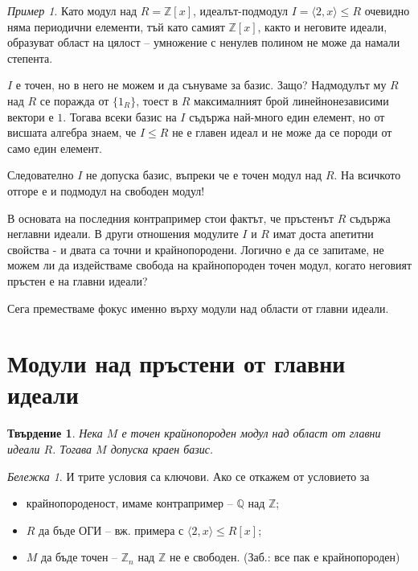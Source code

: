 \documentclass{article}
\newif\ifusemulticols
\theoremstyle{definition}
\theoremstyle{remark}
\newtheorem*{note}{Бележка}
\newtheorem{example}{Пример}[section]
\theoremstyle{plain}
\theoremstyle{plain}
\newtheorem{prop}[theorem]{Твърдение}
\newenvironment{mymulticols}
    { \ifusemulticols \begin{multicols}{2} \fi }
    { \ifusemulticols \end{multicols} \fi }
\newcommand{\Z}{\mathbb{Z}}
\begin{document}
\begin{mymulticols}
\begin{example}
    Като модул над $R = \Z[x]$, идеалът-подмодул $I = \langle 2,x \rangle \le R$ очевидно няма
    периодични елементи, тъй като самият $\Z[x]$, както и неговите идеали, образуват област на
    цялост -- умножение с ненулев полином не може да намали степента.

    $I$ е точен, но в него не можем и да сънуваме за базис. Защо?
    Надмодулът му $R$ над $R$ се поражда от $\{1_R\}$, тоест в $R$ максималният брой
    линейнонезависими вектори е $1$.
    Тогава всеки базис на $I$ съдържа най-много един елемент, но от висшата алгебра знаем, че $I \le
    R$ не е главен идеал и не може да се породи от само един елемент.

    Следователно $I$ не допуска базис, въпреки че е точен модул над $R$.
    На всичкото отгоре е и подмодул на свободен модул!
\end{example}

В основата на последния контрапример стои фактът, че пръстенът $R$ съдържа неглавни идеали.
В други отношения модулите $I$ и $R$ имат доста апетитни свойства - и двата са точни и крайнопородени.
Логично е да се запитаме, не можем ли да издействаме свобода на крайнопороден точен модул, когато
неговият пръстен е на главни идеали?

Сега преместваме фокус именно върху модули над области от главни идеали.

\section{Модули над пръстени от главни идеали}

\begin{prop}
    Нека $M$ е точен крайнопороден модул над област от главни идеали $R$. Тогава $M$ допуска краен
    базис.
\end{prop}

\begin{note}
    И трите условия са ключови. Ако се откажем от условието за
    \begin{itemize}
        \item крайнопороденост, имаме контрапример -- $\mathbb Q$ над $\Z$;
        \item $R$ да бъде ОГИ -- вж. примера с $\langle 2, x \rangle \le R[x]$;
            \item $M$ да бъде точен -- $\Z_n$ над $\Z$ не е свободен. (Заб.: все пак е крайнопороден)
    \end{itemize}
\end{note}


\end{mymulticols}
\end{document}
